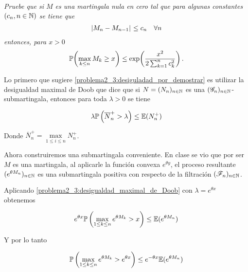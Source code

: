 \emph{
    Pruebe que si $M$ es una martingala nula en cero tal que para algunas constantes $\left( c_n,n\in\mathbb{N}\right) $ se tiene que
    \begin{align}
        \hspace{.25mm}\left|M_n-M_{n-1}\right|\hspace{.25mm}\leq c_n\quad\forall n                                             \label{problema2_3:cota_para_diferencias}
    \end{align}
    entonces, para $x>0$
    \begin{align}
        \mathbb{P}\! \left( \max_{k\leq n} M_k\geq x \right)\leq \exp\!\left( \frac{x^2}{2\sum_{k=1}^n c_k^2}\right) .   \label{problema2_3:desiguladad_por_demostrar}
    \end{align}
}

\afterstatement\par\null

Lo primero que sugiere \eqref{problema2_3:desiguladad_por_demostrar} es utilizar la desigualdad maximal de Doob que dice que si $N=(N_n)_{n\in\mathbb{N}}$
es una $(\mathscr{G}_n)_{n\in\mathbb{N}}$-submartingala, entonces para toda $\lambda > 0$ se tiene

\begin{align}
        \lambda \mathbb{P}\left(\overline{N}_n^+ > \lambda \right) \leq \mathbb{E}(N_n^+) \label{problema2_3:desigualdad_maximal_de_Doob}
\end{align}

Donde $\overline{N}_n^+ = \max\limits_{1 \leq i \leq n} N_n^+$.\par\null

Ahora construiremos una submartingala conveniente. En clase se vio que por ser $M$ es una martingala, al aplicarle la función convexa $e^{\theta y}$, el
proceso resultante $(e^{\theta M_n})_{n \in \mathbb{N}}$ es una submartingala positiva con respecto de la filtración $(\mathscr{F}_n)_{n\in\mathbb{N}}$.\par\null

Aplicando \eqref{problema2_3:desigualdad_maximal_de_Doob} con $\lambda = e^{\theta x}$ obtenemos

\begin{align}
    e^{\theta x} \mathbb{P}\left( \max_{1 \leq k \leq n} e^{\theta M_k} > x \right) \leq \mathbb{E}(e^{\theta M_n})
\end{align}\par\null
 
Y por lo tanto

\begin{align}
    \mathbb{P}\left( \max_{1 \leq k \leq n} e^{\theta M_k} > e^{\theta x} \right) \leq e^{- \theta x} \mathbb{E}(e^{\theta M_n})
\end{align}\par\null

